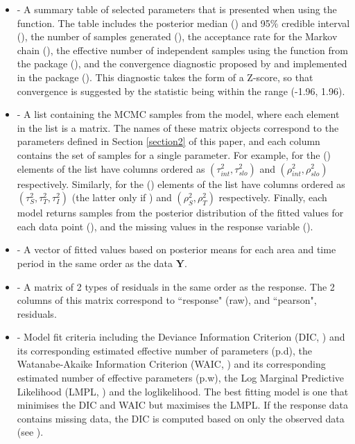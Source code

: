 \documentclass[article, nojss]{jss}
\begin{document}
\begin{itemize}
\item {} - A summary table of selected parameters that is presented when using the  function. The table includes the posterior median () and 95$\%$ credible interval (), the number of samples generated (), the acceptance rate for the Markov chain (), the effective number of independent samples using the   function from the  package (), and the convergence  diagnostic proposed by \cite{geweke1992} and implemented in the  package (). This diagnostic takes the form of a Z-score, so that convergence is suggested by the statistic being within the range (-1.96, 1.96).

\item {} - A list containing the MCMC samples from the model, where each element in the list is a matrix. The names of these matrix objects correspond to the parameters defined in Section \ref{section2} of this paper, and each column contains the set of samples for a single parameter.  For example, for  the () elements of the list have columns ordered as $(\tau^2_{int}, \tau^2_{slo})$ and $(\rho^2_{int}, \rho^2_{slo})$ respectively. Similarly, for   the () elements of the list have columns ordered as $(\tau^2_{S}, \tau^2_{T}, \tau^2_{I})$ (the latter only if ) and $(\rho^2_{S}, \rho^2_{T})$ respectively. Finally, each model returns samples from the posterior distribution of the fitted values for each data point (), and the missing values in the response variable ().

\item {} - A vector of fitted values based on posterior means for each area and time period in the same order as the data $\mathbf{Y}$.

\item {} - A matrix of 2 types of residuals in the same order as the response. The 2 columns of this matrix correspond to ``response" (raw), and ``pearson", residuals.

\item {} - Model fit criteria including the Deviance Information Criterion (DIC, \citealp{spiegelhalter2002}) and its corresponding estimated effective number of parameters (p.d), the Watanabe-Akaike Information Criterion (WAIC, \citealp{watanabe2010}) and its corresponding estimated number of effective parameters (p.w), the Log Marginal Predictive Likelihood (LMPL, \citealp{congdon2005}) and the loglikelihood. The best fitting model is one that minimises the DIC and WAIC but maximises the LMPL. If the response data contains missing data, the DIC is computed based on only the observed data (see \cite{celeux2006}).


\end{itemize}
\end{document}
